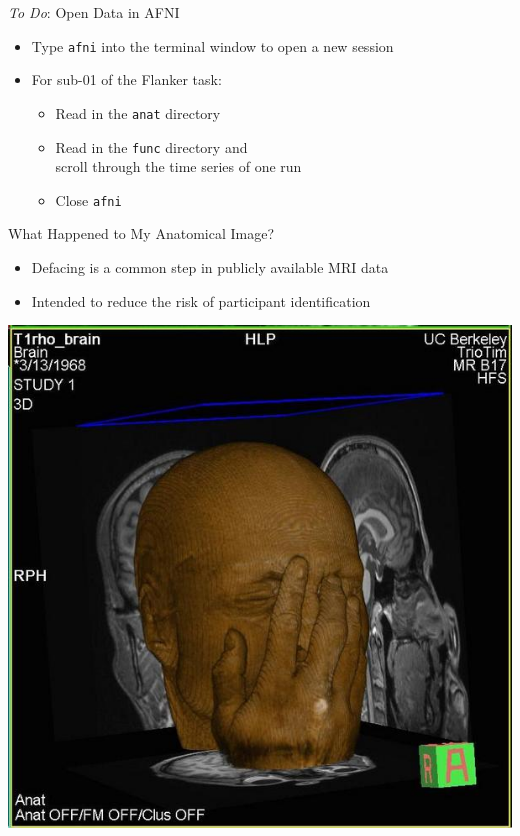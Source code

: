 \documentclass[t,12pt]{beamer}
\begin{document}
\begin{frame}{\emph{To Do}: Open Data in AFNI}
\vspace{10pt}
\begin{itemize}
\setlength\itemsep{1em}
\item Type \texttt{afni} into the terminal window to open a new session
\item For sub-01 of the Flanker task:
\vspace{4pt}
\begin{itemize}
\setlength\itemsep{0.5em}
\item Read in the \texttt{anat} directory
\item Read in the \texttt{func} directory and \\ scroll through the time series of one run
\item Close \texttt{afni}
\end{itemize}
\end{itemize}
\end{frame}

\begin{frame}{What Happened to My Anatomical Image?}
\vspace{10pt}
\begin{itemize}
\setlength\itemsep{1em}
\item Defacing is a common step in publicly available MRI data
\item Intended to reduce the risk of participant identification
\end{itemize}
\vspace{4pt}
\centering
\includegraphics[width=.5\textwidth]{images/practiCalfMRI_facepalm.jpg}
\end{frame}
\end{document}
